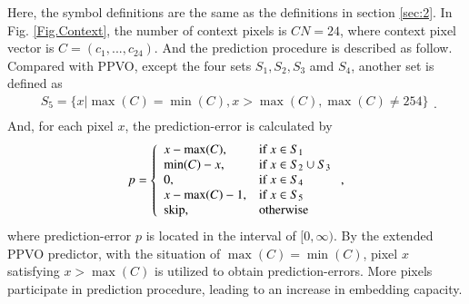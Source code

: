 \documentclass[review,3p,10pt,sort&compress]{elsarticle}
\begin{document}
Here, the symbol definitions are the same as the definitions in section \ref{sec:2}. In Fig. \ref{Fig.Context}, the number of context pixels is $CN = 24$, where context pixel vector is $C = (c_{1}, ..., c_{24})$. And the prediction procedure is described as follow. Compared with PPVO, except the four sets $S_1, S_2, S_3$ amd $S_4$, another set is defined as
\begin{equation*}\label{eq:PPVOCNandHist}
\begin{array}{ll}
S_5 = \{ x | \max(C)   =  \min(C), x > \max(C), \max(C)   \neq  254 \} \\
\end{array}.
\end{equation*}
And, for each pixel $x$, the prediction-error is calculated by
\begin{equation}\label{eq:EPPVOPE}
p = \left\{\begin{array}{ll}
x - \max(C),    & \text{if } x \in S_1  \\
\min(C) - x,    & \text{if } x \in S_2 \cup S_3 \\
0,              & \text{if } x \in S_4 \\
x - \max(C) - 1,& \text{if } x \in S_5  \\
{\rm skip},     & \text{otherwise}
\end{array}\right.,
\end{equation}
where prediction-error $p$ is located in the interval of $[0, \infty)$. By the extended PPVO predictor, with the situation of $\max(C) = \min(C)$, pixel $x$ satisfying $x > \max(C)$ is utilized to obtain prediction-errors. More pixels participate in prediction procedure, leading to an increase in embedding capacity.
\end{document}
